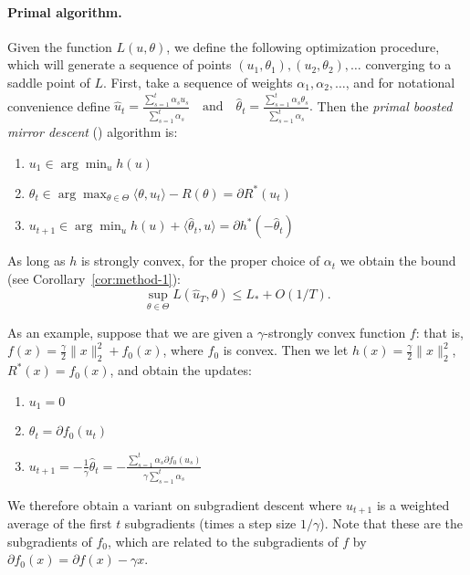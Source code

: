 \documentclass{article} %
\begin{document}
\paragraph{Primal algorithm.}
Given the function $L(u, \theta)$, we define the following 
optimization procedure, which will generate a sequence of 
points $(u_1,\theta_1), (u_2, \theta_2), \ldots$ converging 
to a saddle point of $L$. First, take a sequence of weights
$\alpha_1, \alpha_2, \ldots$, and for notational convenience 
define
\(
\hat{u}_t = \frac{\sum_{s=1}^t \alpha_su_s}{\sum_{s=1}^t \alpha_s} 
\quad \text{and} \quad 
\hat{\theta}_t = \frac{\sum_{s=1}^t \alpha_s\theta_s}{\sum_{s=1}^t \alpha_s}.
\)
Then 
the {\em primal boosted mirror descent} (\primal) algorithm is:
\begin{enumerate}
\item $u_1 \in \arg\min_u h(u)$
\item $\theta_{t} \in \arg\max_{\theta \in \Theta} \langle \theta, u_t \rangle - R(\theta) = \partial R^{*}(u_{t})$
\item $u_{t+1} \in \arg\min_{u} h(u) + \langle \hat{\theta}_t, u \rangle = \partial h^{*}(-\hat\theta_{t})$
\end{enumerate}
As long as $h$ is strongly convex, for the proper choice of $\alpha_{t}$ we 
obtain the bound (see Corollary~\ref{cor:method-1}):
\begin{equation}
\sup_{\theta \in \Theta} L(\hat{u}_T, \theta) \leq L_{*} + O(1/T).
\end{equation}

As an example, suppose that we are given a $\gamma$-strongly convex function 
$f$: that is, $f(x) = \frac{\gamma}{2}\|x\|_2^2 + f_0(x)$, where $f_0$ is convex. 
Then we let $h(x) = \frac{\gamma}{2}\|x\|_2^2$, $R^*(x) = f_0(x)$, and obtain 
the updates:
\begin{enumerate}
\item $u_1 = 0$
\item $\theta_t = \partial f_0(u_t)$
\item $u_{t+1} = -\frac{1}{\gamma}\hat{\theta}_t = -\frac{\sum_{s=1}^t \alpha_s\partial f_0(u_s)}{\gamma \sum_{s=1}^t \alpha_s}$
\end{enumerate}
We therefore obtain a variant on subgradient descent where $u_{t+1}$ 
is a weighted average of the first $t$ subgradients (times a step size 
$1/\gamma$). Note that these are the subgradients of $f_0$, which are related 
to the subgradients of $f$ by $\partial f_0(x) = \partial f(x) - \gamma x$.
\end{document}
